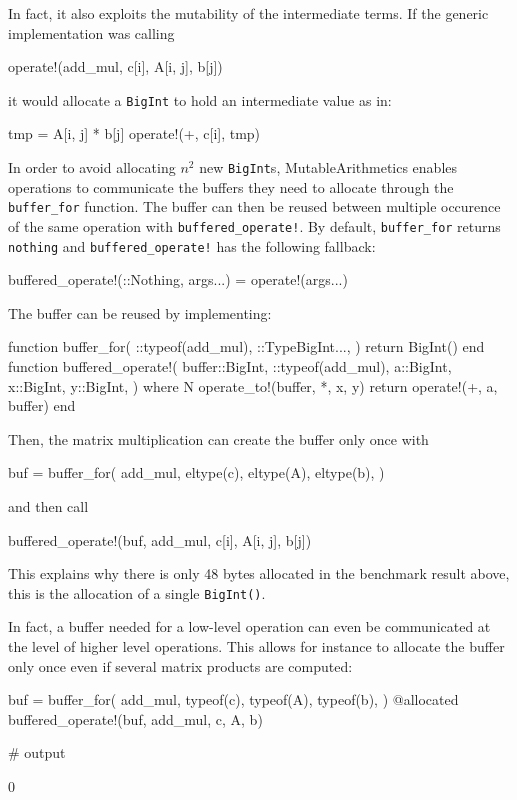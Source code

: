 \documentclass{juliacon}
\newcommand{\ma}{MutableArithmetics}
\begin{document}
In fact, it also exploits the mutability of the intermediate terms.
If the generic implementation was calling
\begin{jllisting}
operate!(add_mul, c[i], A[i, j], b[j])
\end{jllisting}
it would allocate a \lstinline|BigInt| to hold an intermediate value as in:
\begin{jllisting}
tmp = A[i, j] * b[j]
operate!(+, c[i], tmp)
\end{jllisting}
In order to avoid allocating $n^2$ new \lstinline|BigInt|s,
\ma{} enables operations to communicate the buffers they need to allocate through the \lstinline|buffer_for| function.
The buffer can then be reused between multiple occurence of the same operation with \lstinline|buffered_operate!|.
By default, \lstinline|buffer_for| returns \lstinline|nothing|
and \lstinline|buffered_operate!| has the following fallback:
\begin{jllisting}
buffered_operate!(::Nothing, args...) = operate!(args...)
\end{jllisting}
The buffer can be reused by implementing:
\begin{jllisting}
function buffer_for(
    ::typeof(add_mul),
    ::Type{BigInt}...,
)
    return BigInt()
end
function buffered_operate!(
    buffer::BigInt,
    ::typeof(add_mul),
    a::BigInt,
    x::BigInt,
    y::BigInt,
) where {N}
    operate_to!(buffer, *, x, y)
    return operate!(+, a, buffer)
end

\end{jllisting}
Then, the matrix multiplication can create the buffer
only once with
\begin{jllisting}
buf = buffer_for(
    add_mul,
    eltype(c),
    eltype(A),
    eltype(b),
)
\end{jllisting}
and then call
\begin{jllisting}
buffered_operate!(buf, add_mul, c[i], A[i, j], b[j])
\end{jllisting}
This explains why there is only 48 bytes allocated in the benchmark result above, this is the
allocation of a single \lstinline|BigInt()|.

In fact, a buffer needed for a low-level operation can even be communicated
at the level of higher level operations.
This allows for instance to allocate the buffer only once even if
several matrix products are computed:
\begin{jllisting}
buf = buffer_for(
    add_mul,
    typeof(c),
    typeof(A),
    typeof(b),
)
@allocated buffered_operate!(buf, add_mul, c, A, b)

# output

0
\end{jllisting}
\end{document}
